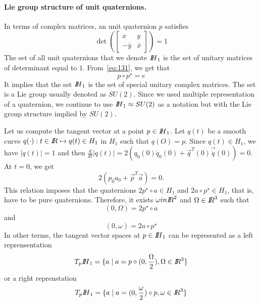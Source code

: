 \paragraph{Lie group structure of unit quaternions.} In terms of complex matrices, an unit quaternion $p$ satisfies
\begin{equation}
  \label{eq:125}
  \det\left(    \begin{bmatrix}
      x &y  \\
      - \bar y  & \bar x
    \end{bmatrix} \right) =1
\end{equation}
The set of all unit quaternions that we denote $\mbox{\rm $I\!\!H$}_1$ is the set of unitary matrices of determinant equal to $1$. From~\eqref{eq:131}, we get that
\begin{equation}
  \label{eq:126}
  p \circ p^\star = e  
\end{equation}
It implies that the set $\mbox{\rm $I\!\!H$}_1$ is the set of special unitary complex matrices. The set is a Lie group usually denoted as $SU(2)$. Since we used multiple representation of a quaternion, we continue to use $\mbox{\rm $I\!\!H$}_1 \approx SU(2)$ as a notation but with the Lie group structure implied by $SU(2)$.

Let us compute the tangent vector at a point $p \in \mbox{\rm $I\!\!H$}_1$. Let $q(t)$ be  a smooth curve $q(\cdot) : t\in \mbox{\rm $I\!\!R$} \mapsto q(t)\in H_1$ in $H_1$ such that $q(O)= p$.
Since $q(t)\in H_1$, we have $|q(t)|=1$ and then $\frac{d}{dt} |q(t)| = 2(q_0(0) \dot q_0(0) + \vec{q}^T(0) \vec{\dot q}(0) ) =0$. At $t=0$, we get
\begin{equation}
  \label{eq:48}
  2(p_0 a_0 + \vec{p}^T \vec{a})= 0.
\end{equation}
This relation imposes that the quaternions $2 p^\star \circ a \in H_1$ and $2 a \circ p^\star \in H_1$, that is, have to be pure quaternions. Therefore, it exists $\omega in \mbox{\rm $I\!\!R$}^2$  and $\Omega \in \mbox{\rm $I\!\!R$}^3$ such that
\begin{equation}
  \label{eq:132}
  (0, \Omega) = 2 p ^\star \circ a 
\end{equation}
and
\begin{equation}
  \label{eq:132}
  (0, \omega) = 2 a\circ p^\star
\end{equation}
In other terms, the tangent vector spaces at $p \in \mbox{\rm $I\!\!H$}_1$ can be represented as a left reprensentation
\begin{equation}
  \label{eq:133}
  T_p\mbox{\rm $I\!\!H$}_1 = \{ a \mid a = p \circ (0, \frac \Omega 2 ), \Omega \in \mbox{\rm $I\!\!R$}^3\}
\end{equation}
or a right reprenstation
\begin{equation}
  \label{eq:133}
  T_p{\mbox{\rm $I\!\!H$}_1} = \{ a \mid a =  (0, \frac \omega 2 ) \circ p, \omega \in \mbox{\rm $I\!\!R$}^3\}
\end{equation}

